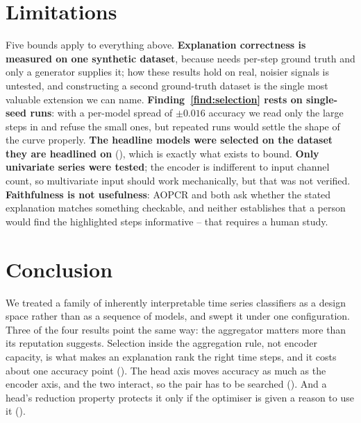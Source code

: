 %

\section{Limitations}
\label{sec:limitations}

Five bounds apply to everything above. \textbf{Explanation correctness is measured on one synthetic
dataset}, because \ndcg{} needs per-step ground truth and only a generator supplies it; how these
results hold on real, noisier signals is untested, and constructing a second ground-truth dataset is
the single most valuable extension we can name. \textbf{Finding~\ref{find:selection} rests on
single-seed runs}: with a per-model spread of $\pm0.016$ accuracy we read only the large steps in
 and refuse the small ones, but repeated runs would settle the shape of the curve
properly. \textbf{The headline models were selected on the dataset they are headlined on}
(), which is exactly what  exists to bound. \textbf{Only univariate
series were tested}; the encoder is indifferent to input channel count, so multivariate input should
work mechanically, but that was not verified. \textbf{Faithfulness is not usefulness}: AOPCR and
\ndcg{} both ask whether the stated explanation matches something checkable, and neither establishes
that a person would find the highlighted steps informative -- that requires a human study.

\section{Conclusion}
\label{sec:conclusion}

We treated a family of inherently interpretable time series classifiers as a design space rather
than as a sequence of models, and swept it under one configuration. Three of the four results point
the same way: the aggregator matters more than its reputation suggests. Selection inside the
aggregation rule, not encoder capacity, is what makes an explanation rank the right time steps, and
it costs about one accuracy point (). The head axis moves accuracy as much as the
encoder axis, and the two interact, so the pair has to be searched (). And a head's
reduction property protects it only if the optimiser is given a reason to use it
().

